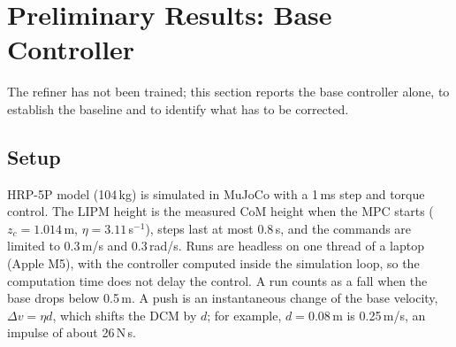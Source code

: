 \documentclass[conference]{IEEEtran}
\begin{document}
\section{Preliminary Results: Base Controller}
\label{sec:results}

The refiner has not been trained; this section reports the base controller alone, to establish the baseline and to identify what has to be corrected.

\subsection{Setup}
HRP-5P model (104\,kg) is simulated in MuJoCo \cite{todorov2012mujoco} with a 1\,ms step and torque control.
The LIPM height is the measured CoM height when the MPC starts ($z_c=1.014$\,m, $\eta=3.11$\,s$^{-1}$), steps last at most 0.8\,s, and the commands are limited to 0.3\,m/s and 0.3\,rad/s.
Runs are headless on one thread of a laptop (Apple M5), with the controller computed inside the simulation loop, so the computation time does not delay the control.
A run counts as a fall when the base drops below 0.5\,m.
A push is an instantaneous change of the base velocity, $\Delta v=\eta d$, which shifts the DCM by $d$; for example, $d=0.08$\,m is 0.25\,m/s, an impulse of about 26\,N\,s.

\begin{table}[t]
\caption{Walking in simulation (base controller, no falls)}
\label{tab:walk}
\centering
\setlength{\tabcolsep}{3pt}
\end{table}
\end{document}
